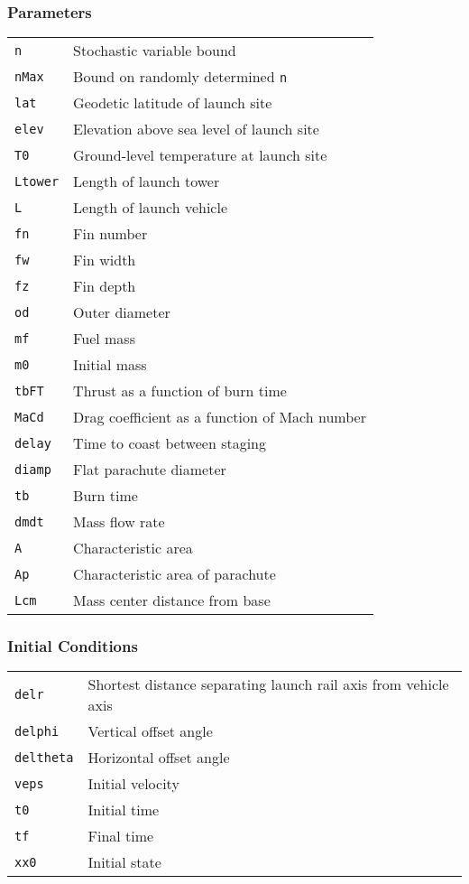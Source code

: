\documentclass[11pt]{thesis}
\numberwithin{equation}{section}
\begin{document}
\subsubsection*{Parameters}
\begin{longtable}[l]{l l}
\texttt{n} & Stochastic variable bound \\
\texttt{nMax} & Bound on randomly determined \texttt{n} \\
\texttt{lat} & Geodetic latitude of launch site \\
\texttt{elev} & Elevation above sea level of launch site \\
\texttt{T0} & Ground-level temperature at launch site \\
\texttt{Ltower} & Length of launch tower \\
\texttt{L} & Length of launch vehicle \\
\texttt{fn} & Fin number \\
\texttt{fw} & Fin width \\
\texttt{fz} & Fin depth\\
\texttt{od} & Outer diameter \\
\texttt{mf} & Fuel mass \\
\texttt{m0} & Initial mass \\
\texttt{tbFT} & Thrust as a function of burn time \\
\texttt{MaCd} & Drag coefficient as a function of Mach number \\
\texttt{delay} & Time to coast between staging \\
\texttt{diamp} & Flat parachute diameter \\
\texttt{tb} & Burn time\\
\texttt{dmdt} & Mass flow rate \\
\texttt{A} & Characteristic area \\
\texttt{Ap} & Characteristic area of parachute \\
\texttt{Lcm} & Mass center distance from base
\end{longtable}
\subsubsection*{Initial Conditions}
\begin{longtable}[l]{l l}
\texttt{delr} & Shortest distance separating launch rail axis from vehicle axis \\
\texttt{delphi} & Vertical offset angle \\
\texttt{deltheta} & Horizontal offset angle \\
\texttt{veps} & Initial velocity \\
\texttt{t0} & Initial time \\
\texttt{tf} & Final time \\
\texttt{xx0} & Initial state
\end{longtable}
\end{document}
